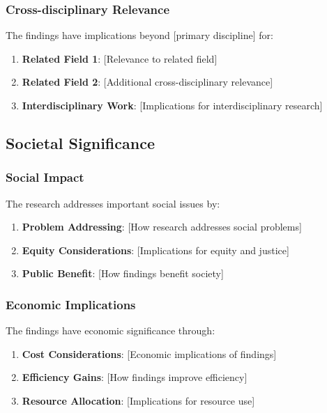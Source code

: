 \documentclass[
  12pt,
  letterpaper,
  12pt,
  letterpaper,
  oneside]{report}
\providecommand{\tightlist}{%
  \setlength{\itemsep}{0pt}\setlength{\parskip}{0pt}}
\begin{document}
\subsubsection{Cross-disciplinary
Relevance}\label{cross-disciplinary-relevance}

The findings have implications beyond {[}primary discipline{]} for:

\begin{enumerate}
\def\labelenumi{\arabic{enumi}.}
\tightlist
\item
  \textbf{Related Field 1}: {[}Relevance to related field{]}
\item
  \textbf{Related Field 2}: {[}Additional cross-disciplinary
  relevance{]}
\item
  \textbf{Interdisciplinary Work}: {[}Implications for interdisciplinary
  research{]}
\end{enumerate}

\subsection{Societal Significance}\label{societal-significance}

\subsubsection{Social Impact}\label{social-impact}

The research addresses important social issues by:

\begin{enumerate}
\def\labelenumi{\arabic{enumi}.}
\tightlist
\item
  \textbf{Problem Addressing}: {[}How research addresses social
  problems{]}
\item
  \textbf{Equity Considerations}: {[}Implications for equity and
  justice{]}
\item
  \textbf{Public Benefit}: {[}How findings benefit society{]}
\end{enumerate}

\subsubsection{Economic Implications}\label{economic-implications}

The findings have economic significance through:

\begin{enumerate}
\def\labelenumi{\arabic{enumi}.}
\tightlist
\item
  \textbf{Cost Considerations}: {[}Economic implications of findings{]}
\item
  \textbf{Efficiency Gains}: {[}How findings improve efficiency{]}
\item
  \textbf{Resource Allocation}: {[}Implications for resource use{]}
\end{enumerate}
\end{document}
